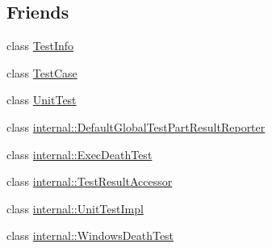 \subsection*{Friends}
\begin{DoxyCompactItemize}
\item 
class \hyperlink{classtesting_1_1_test_result_aed3c96e2bd5a46339c1cbe49a4a233ee}{Test\-Info}
\item 
class \hyperlink{classtesting_1_1_test_result_a61fe0349d692eb6d4f5b94e35049b2e9}{Test\-Case}
\item 
class \hyperlink{classtesting_1_1_test_result_aaeb07ea6ba11473f5b2ff2067a1d734a}{Unit\-Test}
\item 
class \hyperlink{classtesting_1_1_test_result_ac731f0389a3fc3cae64a80a5e53acc2a}{internal\-::\-Default\-Global\-Test\-Part\-Result\-Reporter}
\item 
class \hyperlink{classtesting_1_1_test_result_a6a009268369159ee3ff3d162e5c9f0b4}{internal\-::\-Exec\-Death\-Test}
\item 
class \hyperlink{classtesting_1_1_test_result_a9409280e3d708ddb050e1b9922b91522}{internal\-::\-Test\-Result\-Accessor}
\item 
class \hyperlink{classtesting_1_1_test_result_aa684cc13a8f91b00c0c9ce41ec7474eb}{internal\-::\-Unit\-Test\-Impl}
\item 
class \hyperlink{classtesting_1_1_test_result_ab7ea7e66d98b6380f6216e44ce744390}{internal\-::\-Windows\-Death\-Test}
\end{DoxyCompactItemize}


